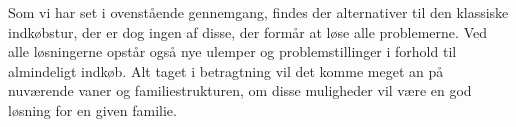 %

Som vi har set i ovenstående gennemgang, findes der alternativer til den klassiske indkøbstur, der er dog ingen af disse, der formår at løse alle problemerne.
Ved alle løsningerne opstår også nye ulemper og problemstillinger i forhold til almindeligt indkøb.
Alt taget i betragtning vil det komme meget an på nuværende vaner og familiestrukturen, om disse muligheder vil være en god løsning for en given familie.
